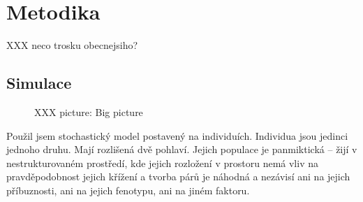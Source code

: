 \chapter{Metodika}



XXX neco trosku obecnejsiho?

\section{Simulace}

\begin{figure}[h]
    \centering


    \caption{XXX picture: Big picture}
\end{figure}

Použil jsem stochastický model postavený na individuích. Individua jsou jedinci jednoho druhu. Mají rozlišená
dvě pohlaví. Jejich populace je panmiktická -- žijí v nestrukturovaném prostředí, kde jejich rozložení v prostoru nemá
vliv na pravděpodobnost jejich křížení a tvorba párů je náhodná a nezávisí ani na jejich příbuznosti, ani na jejich
fenotypu, ani na jiném faktoru.

